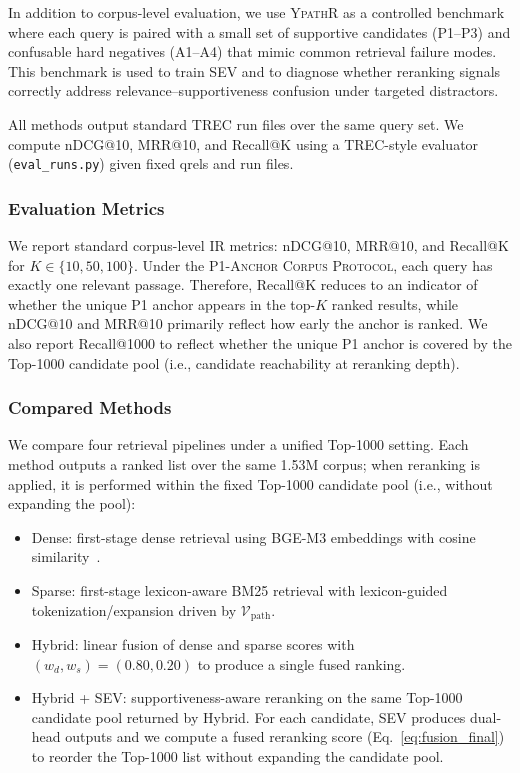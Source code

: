 \documentclass[preprint,12pt,a4paper]{elsarticle}
\begin{document}
In addition to corpus-level evaluation, we use \textsc{YpathR} as a controlled benchmark where each query is paired with a small set of supportive candidates (P1--P3) and confusable hard negatives (A1--A4) that mimic common retrieval failure modes.
This benchmark is used to train SEV and to diagnose whether reranking signals correctly address relevance--supportiveness confusion under targeted distractors.

All methods output standard TREC run files over the same query set.
We compute nDCG@10, MRR@10, and Recall@K using a TREC-style evaluator (\texttt{eval\_runs.py}) given fixed qrels and run files.

\subsubsection{Evaluation Metrics}
\label{subsubsec:exp_metrics}
We report standard corpus-level IR metrics: nDCG@10, MRR@10, and Recall@K for $K\in\{10,50,100\}$.
Under the \textsc{P1-Anchor Corpus Protocol}, each query has exactly one relevant passage.
Therefore, Recall@K reduces to an indicator of whether the unique P1 anchor appears in the top-$K$ ranked results, while nDCG@10 and MRR@10 primarily reflect how early the anchor is ranked.
We also report Recall@1000 to reflect whether the unique P1 anchor is covered by the Top-1000 candidate pool (i.e., candidate reachability at reranking depth).

\subsubsection{Compared Methods}
\label{subsubsec:exp_methods}
We compare four retrieval pipelines under a unified Top-1000 setting.
Each method outputs a ranked list over the same 1.53M corpus; when reranking is applied, it is performed within the fixed Top-1000 candidate pool (i.e., without expanding the pool):

\begin{itemize}[leftmargin=*]
  \item Dense: first-stage dense retrieval using BGE-M3 embeddings with cosine similarity~\cite{chen2024m3embedding}.
  \item Sparse: first-stage lexicon-aware BM25 retrieval with lexicon-guided tokenization/expansion driven by $\mathcal{V}_{\text{path}}$.
  \item Hybrid: linear fusion of dense and sparse scores with $(w_d,w_s)=(0.80,0.20)$ to produce a single fused ranking.
  \item Hybrid + SEV: supportiveness-aware reranking on the same Top-1000 candidate pool returned by Hybrid.
  For each candidate, SEV produces dual-head outputs and we compute a fused reranking score (Eq.~\ref{eq:fusion_final}) to reorder the Top-1000 list without expanding the candidate pool.
\end{itemize}
\end{document}
